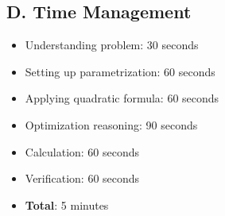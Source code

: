 \documentclass[11pt]{article}
\begin{document}
\begin{roadmapbox}
\subsection*{D. Time Management}
\begin{itemize}[leftmargin=*]
    \item Understanding problem: 30 seconds
    \item Setting up parametrization: 60 seconds
    \item Applying quadratic formula: 60 seconds
    \item Optimization reasoning: 90 seconds
    \item Calculation: 60 seconds
    \item Verification: 60 seconds
    \item \textbf{Total}: 5 minutes
\end{itemize}
\end{roadmapbox}
\end{document}
